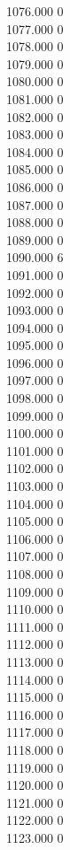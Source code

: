 { 1076.000	0 \\
 1077.000	0 \\
 1078.000	0 \\
 1079.000	0 \\
 1080.000	0 \\
 1081.000	0 \\
 1082.000	0 \\
 1083.000	0 \\
 1084.000	0 \\
 1085.000	0 \\
 1086.000	0 \\
 1087.000	0 \\
 1088.000	0 \\
 1089.000	0 \\
 1090.000	6 \\
 1091.000	0 \\
 1092.000	0 \\
 1093.000	0 \\
 1094.000	0 \\
 1095.000	0 \\
 1096.000	0 \\
 1097.000	0 \\
 1098.000	0 \\
 1099.000	0 \\
 1100.000	0 \\
 1101.000	0 \\
 1102.000	0 \\
 1103.000	0 \\
 1104.000	0 \\
 1105.000	0 \\
 1106.000	0 \\
 1107.000	0 \\
 1108.000	0 \\
 1109.000	0 \\
 1110.000	0 \\
 1111.000	0 \\
 1112.000	0 \\
 1113.000	0 \\
 1114.000	0 \\
 1115.000	0 \\
 1116.000	0 \\
 1117.000	0 \\
 1118.000	0 \\
 1119.000	0 \\
 1120.000	0 \\
 1121.000	0 \\
 1122.000	0 \\
 1123.000	0 \\
}
